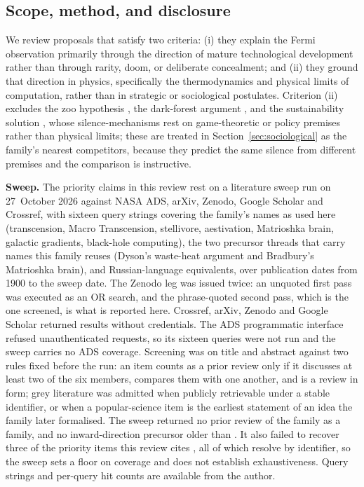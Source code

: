 \documentclass[11pt]{article}
\begin{document}
\subsection{Scope, method, and disclosure}

We review proposals that satisfy two criteria: (i) they explain the Fermi observation primarily through the direction of mature technological development rather than through rarity, doom, or deliberate concealment; and (ii) they ground that direction in physics, specifically the thermodynamics and physical limits of computation, rather than in strategic or sociological postulates. Criterion (ii) excludes the zoo hypothesis \citep{Ball1973}, the dark-forest argument \citep{Brin1983,Yu2015,Forgan2017}, and the sustainability solution \citep{HaqqMisraBaum2009}, whose silence-mechanisms rest on game-theoretic or policy premises rather than physical limits; these are treated in Section~\ref{sec:sociological} as the family's nearest competitors, because they predict the same silence from different premises and the comparison is instructive.

\textbf{Sweep.} The priority claims in this review rest on a literature sweep run on 27~October 2026 against NASA ADS, arXiv, Zenodo, Google Scholar and Crossref, with sixteen query strings covering the family's names as used here (transcension, Macro Transcension, stellivore, aestivation, Matrioshka brain, galactic gradients, black-hole computing), the two precursor threads that carry names this family reuses (Dyson's waste-heat argument and Bradbury's Matrioshka brain), and Russian-language equivalents, over publication dates from 1900 to the sweep date. The Zenodo leg was issued twice: an unquoted first pass was executed as an OR search, and the phrase-quoted second pass, which is the one screened, is what is reported here. Crossref, arXiv, Zenodo and Google Scholar returned results without credentials. The ADS programmatic interface refused unauthenticated requests, so its sixteen queries were not run and the sweep carries no ADS coverage. Screening was on title and abstract against two rules fixed before the run: an item counts as a prior review only if it discusses at least two of the six members, compares them with one another, and is a review in form; grey literature was admitted when publicly retrievable under a stable identifier, or when a popular-science item is the earliest statement of an idea the family later formalised. The sweep returned no prior review of the family as a family, and no inward-direction precursor older than \citet{Lefebvre2000}. It also failed to recover three of the priority items this review cites \citep{Vidal2011,Inoue2011,Curtis2026DysonMinds}, all of which resolve by identifier, so the sweep sets a floor on coverage and does not establish exhaustiveness. Query strings and per-query hit counts are available from the author.
\end{document}
